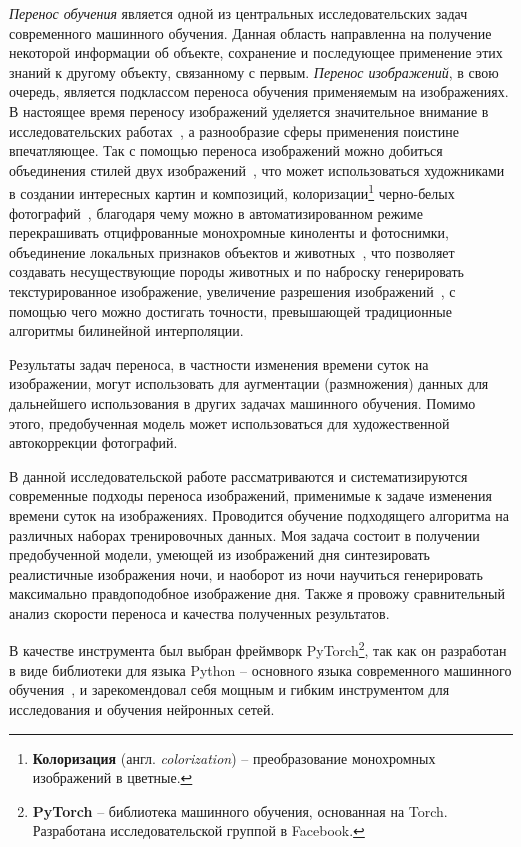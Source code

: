 \documentclass[11pt,a4paper]{extarticle}
\begin{document}
	\textit{Перенос обучения} является одной из центральных исследовательских задач современного машинного обучения.
	Данная область направленна на получение некоторой информации об объекте, сохранение и последующее применение этих знаний к другому объекту, связанному с первым.   
	\textit{Перенос изображений}, в свою очередь, является подклассом переноса обучения применяемым на изображениях. 
	В настоящее время переносу изображений уделяется значительное внимание в исследовательских работах~\cite{i2ipapers}, а разнообразие сферы применения поистине впечатляющее.
	Так с помощью переноса изображений можно добиться объединения стилей двух изображений~\cite{style_transfer}, что может использоваться художниками в создании интересных картин и композиций,
	колоризации\footnote{ \textbf{Колоризация} (англ. \textit{colorization}) -- преобразование монохромных изображений в цветные.} черно-белых фотографий~\cite{color_transfer},
	благодаря чему можно в автоматизированном режиме перекрашивать отцифрованные монохромные киноленты и фотоснимки,
	объединение локальных признаков объектов и животных~\cite{CycleGAN}, что позволяет создавать несуществующие породы животных и по наброску генерировать текстурированное изображение,
	увеличение разрешения изображений~\cite{super_resolution}, с помощью чего можно достигать точности, превышающей традиционные алгоритмы билинейной интерполяции.

	Результаты задач переноса, в частности изменения времени суток на изображении, могут использовать для аугментации (размножения) данных для дальнейшего использования в других задачах машинного обучения.
	Помимо этого, предобученная модель может использоваться для художественной автокоррекции фотографий.
	
	В данной исследовательской работе рассматриваются и систематизируются современные подходы переноса изображений, применимые к задаче изменения времени суток на изображениях.
	Проводится обучение подходящего алгоритма на различных наборах тренировочных данных.
	Моя задача состоит в получении предобученной модели, умеющей из изображений дня синтезировать реалистичные изображения ночи,
	и наоборот из ночи научиться генерировать максимально правдоподобное изображение дня. 
	Также я провожу сравнительный анализ скорости переноса и качества полученных результатов.

	В качестве инструмента был выбран фреймворк PyTorch\footnote{
		\textbf{PyTorch} -- библиотека машинного обучения, основанная на Torch. Разработана исследовательской группой в Facebook.
	}, так как он разработан в виде библиотеки для языка Python -- основного языка современного машинного обучения~\cite{ml_lang},
	и зарекомендовал себя мощным и гибким инструментом для исследования и обучения нейронных сетей.
\end{document}
